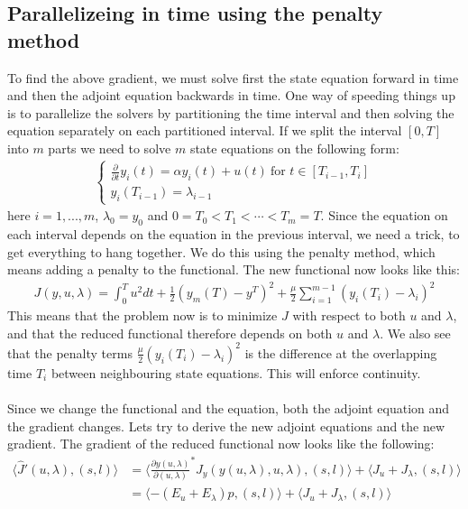 \documentclass[11pt,a4paper]{article}
\begin{document}
\subsection{Parallelizeing in time using the penalty method}
To find the above gradient, we must solve first the state equation forward in time and then the adjoint equation backwards in time. One way of speeding things up is to parallelize the solvers by partitioning the time interval and then solving the equation separately on each partitioned interval. If we split the interval $[0,T]$ into $m$ parts we need to solve $m$ state equations on the following form:
\begin{align*}
   \left\{
     \begin{array}{lr}
       \frac{\partial }{\partial t} y_i(t) = \alpha y_i(t) + u(t) \ \text{for $t \in [T_{i-1},T_{i}]$}\\
	y_i(T_{i-1}) = \lambda_{i-1}
     \end{array}
   \right.
\end{align*}
here $i=1,...,m$, $\lambda_0=y_0$ and $0=T_0<T_1<\cdots<T_{m}=T$. Since the equation on each interval depends on the equation in the previous interval, we need a trick, to get everything to hang together. We do this using the penalty method, which means adding a penalty to the functional. The new functional now looks like this:
\begin{align}
J(y,u,\lambda) = \int_0^T u^2 dt + \frac{1}{2}(y_m(T)-y^T)^2 + \frac{\mu}{2} \sum_{i=1}^{m-1} (y_{i}(T_i)-\lambda_i)^2 \label{penalty_func}
\end{align}
This means that the problem now is to minimize $J$ with respect to both $u$ and $\lambda$, and that the reduced functional therefore depends on both $u$ and $\lambda$. We also see that the penalty terms $\frac{\mu}{2}(y_{i}(T_i)-\lambda_i)^2$ is the difference at the overlapping time $T_i$ between neighbouring state equations. This will enforce continuity. 
\\
\\
Since we change the functional and the equation, both the adjoint equation and the gradient changes. Lets try to derive the new adjoint equations and the new gradient. The gradient of the reduced functional now looks like the following:
\begin{align}
\langle \hat{J}'(u,\lambda), (s,l)\rangle &= \langle \frac{\partial y(u,\lambda)}{\partial(u,\lambda)}^* J_y(y(u,\lambda),u,\lambda), (s,l)\rangle + \langle J_u+J_{\lambda}, (s,l)\rangle \\
&=\langle -(E_u+E_{\lambda})p , (s,l)\rangle + \langle J_u+J_{\lambda}, (s,l)\rangle \label{pen_abs_grad}
\end{align} 
\end{document}
